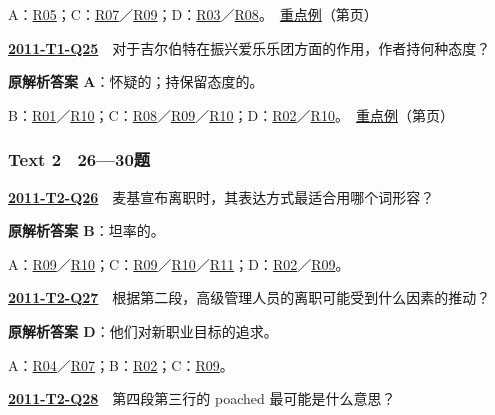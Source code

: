 \documentclass[11pt,a4paper]{article}
\begin{document}
\noindent A：\hyperref[cat-R05]{R05}；C：\hyperref[cat-R07]{R07}／\hyperref[cat-R09]{R09}；D：\hyperref[cat-R03]{R03}／\hyperref[cat-R08]{R08}。　\hyperref[case-2011-T1-Q24]{重点例}（第\pageref{case-2011-T1-Q24}页）\par\smallskip
{}\label{idx-2011-T1-Q25}\noindent\textbf{\href{https://zj139.github.io/math-notes/english/9de80db7356ff635cec8a286/\#q25}{2011-T1-Q25}}　对于吉尔伯特在振兴爱乐乐团方面的作用，作者持何种态度？\par\nopagebreak
\noindent\textbf{原解析答案 A}：怀疑的；持保留态度的。\par\nopagebreak
\noindent B：\hyperref[cat-R01]{R01}／\hyperref[cat-R10]{R10}；C：\hyperref[cat-R08]{R08}／\hyperref[cat-R09]{R09}／\hyperref[cat-R10]{R10}；D：\hyperref[cat-R02]{R02}／\hyperref[cat-R10]{R10}。　\hyperref[case-2011-T1-Q25]{重点例}（第\pageref{case-2011-T1-Q25}页）\par\smallskip
{}\subsubsection{Text 2　26—30题}
\label{idx-2011-T2-Q26}\noindent\textbf{\href{https://zj139.github.io/math-notes/english/fab88b1777828e64dff31c90/\#q26}{2011-T2-Q26}}　麦基宣布离职时，其表达方式最适合用哪个词形容？\par\nopagebreak
\noindent\textbf{原解析答案 B}：坦率的。\par\nopagebreak
\noindent A：\hyperref[cat-R09]{R09}／\hyperref[cat-R10]{R10}；C：\hyperref[cat-R09]{R09}／\hyperref[cat-R10]{R10}／\hyperref[cat-R11]{R11}；D：\hyperref[cat-R02]{R02}／\hyperref[cat-R09]{R09}。\par\smallskip
{}\label{idx-2011-T2-Q27}\noindent\textbf{\href{https://zj139.github.io/math-notes/english/fab88b1777828e64dff31c90/\#q27}{2011-T2-Q27}}　根据第二段，高级管理人员的离职可能受到什么因素的推动？\par\nopagebreak
\noindent\textbf{原解析答案 D}：他们对新职业目标的追求。\par\nopagebreak
\noindent A：\hyperref[cat-R04]{R04}／\hyperref[cat-R07]{R07}；B：\hyperref[cat-R02]{R02}；C：\hyperref[cat-R09]{R09}。\par\smallskip
{}\label{idx-2011-T2-Q28}\noindent\textbf{\href{https://zj139.github.io/math-notes/english/fab88b1777828e64dff31c90/\#q28}{2011-T2-Q28}}　第四段第三行的 poached 最可能是什么意思？\par\nopagebreak
\end{document}
